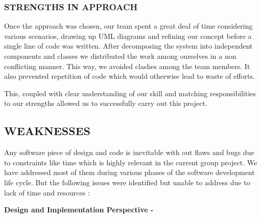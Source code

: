 \documentclass[11pt,a4paper]{article}
\begin{document}
		\subsubsection{STRENGTHS IN APPROACH}
		Once the approach was chosen, our team spent a great deal of time considering various scenarios, drawing up UML diagrams and refining our concept before a single line of code was written. After decomposing the system into independent components and classes we distributed the work among ourselves in a non conflicting manner. This way, we avoided clashes among the team members. It also prevented repetition of code which would otherwise lead to waste of efforts.
		
			This, coupled with clear understanding of our skill and matching responsibilities to our strengths allowed us to successfully carry out this project.
		
	\subsection{WEAKNESSES}
	Any software piece of design and code is inevitable with out flaws and bugs due to constraints like time which is highly relevant in the current group project. We have addressed most of them during various phases of the software development life cycle. But the following issues were identified but unable to address due to lack of time and resources :
	
	\textbf{Design and Implementation Perspective -}
	
\end{document}
